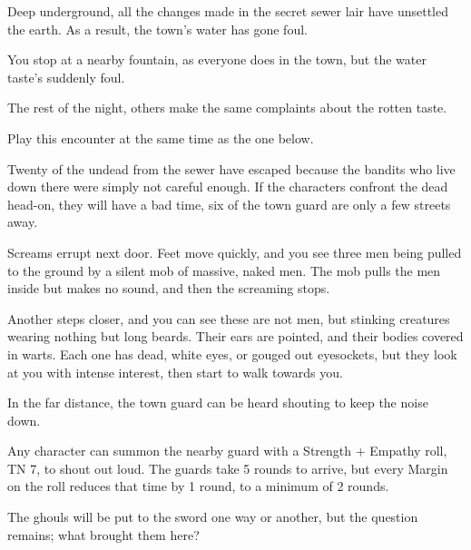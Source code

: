 \begin{multicols}{2}

Deep underground, all the changes made in the secret sewer lair have unsettled the earth.
As a result, the town's water has gone foul.

\begin{boxtext}

	You stop at a nearby fountain, as everyone does in the town, but the water taste's suddenly foul.

	The rest of the night, others make the same complaints about the rotten taste.

\end{boxtext}

Play this encounter at the same time as the one below.


Twenty of the undead from the sewer have escaped because the bandits who live down there were simply not careful enough.  If the characters confront the dead head-on, they will have a bad time, six of the town guard are only a few streets away.

\begin{boxtext}

	Screams errupt next door.  Feet move quickly, and you see three men being pulled to the ground by a silent mob of massive, naked men.  The mob pulls the men inside but makes no sound, and then the screaming stops.

	Another steps closer, and you can see these are not men, but stinking creatures wearing nothing but long beards.
	Their ears are pointed, and their bodies covered in warts.
	Each one has dead, white eyes, or gouged out eyesockets, but they look at you with intense interest, then start to walk towards you.

	In the far distance, the town guard can be heard shouting to keep the noise down.

\end{boxtext}

Any character can summon the nearby guard with a Strength + Empathy roll, TN 7, to shout out loud.
The guards take 5 rounds to arrive, but every Margin on the roll reduces that time by 1 round, to a minimum of 2 rounds.


The ghouls will be put to the sword one way or another, but the question remains; what brought them here?

\undeadhobgoblin



\end{multicols}
